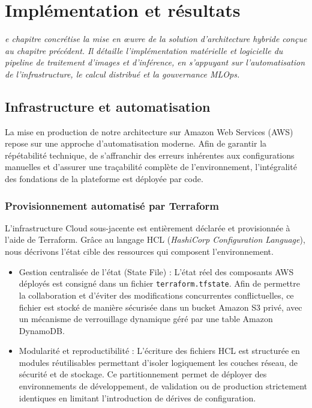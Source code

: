 \let\textcircled=\pgftextcircled

\chapter{Implémentation et résultats}
\label{chap:implementation_resultats}

\textit{e chapitre concrétise la mise en œuvre de la solution d'architecture hybride conçue au chapitre précédent. Il détaille l'implémentation matérielle et logicielle du pipeline de traitement d'images et d'inférence, en s'appuyant sur l'automatisation de l'infrastructure, le calcul distribué et la gouvernance MLOps.}

\renewcommand{\mtctitle}{Sommaire}
\minitoc
\newpage

\section{Infrastructure et automatisation}
\label{sec:deploiement_infra_auto}

La mise en production de notre architecture sur Amazon Web Services (AWS) repose sur une approche d'automatisation moderne. Afin de garantir la répétabilité technique, de s'affranchir des erreurs inhérentes aux configurations manuelles et d'assurer une traçabilité complète de l'environnement, l'intégralité des fondations de la plateforme est déployée par code.

\subsection{Provisionnement automatisé par Terraform}
L'infrastructure Cloud sous-jacente est entièrement déclarée et provisionnée à l'aide de Terraform. Grâce au langage HCL (\textit{HashiCorp Configuration Language}), nous décrivons l'état cible des ressources qui composent l'environnement.

\begin{itemize}
    \item[$\bullet$] Gestion centralisée de l'état (State File) : L'état réel des composants AWS déployés est consigné dans un fichier \texttt{terraform.tfstate}. Afin de permettre la collaboration et d'éviter des modifications concurrentes conflictuelles, ce fichier est stocké de manière sécurisée dans un bucket Amazon S3 privé, avec un mécanisme de verrouillage dynamique géré par une table Amazon DynamoDB.
    \item[$\bullet$] Modularité et reproductibilité : L'écriture des fichiers HCL est structurée en modules réutilisables permettant d'isoler logiquement les couches réseau, de sécurité et de stockage. Ce partitionnement permet de déployer des environnements de développement, de validation ou de production strictement identiques en limitant l'introduction de dérives de configuration.
\end{itemize}

